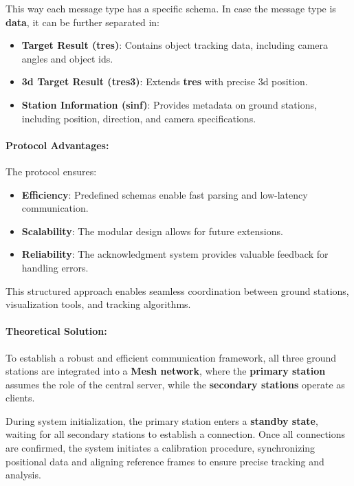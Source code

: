 This way each message type has a specific schema. In case the message type is \textbf{data}, it can be further separated in:

\begin{itemize}
	\item \textbf{Target Result (tres)}: Contains object tracking data, including camera angles and object \acrshort{id}s.
	\item \textbf{\acrshort{3d} Target Result (tres3)}: Extends \textbf{tres} with precise \acrshort{3d} position.
	\item \textbf{Station Information (sinf)}: Provides metadata on ground stations, including position, direction, and camera specifications.
\end{itemize}

\paragraph{Protocol Advantages:}

The protocol ensures:
\begin{itemize}
	\item \textbf{Efficiency}: Predefined schemas enable fast parsing and low-latency communication.
	\item \textbf{Scalability}: The modular design allows for future extensions.
	\item \textbf{Reliability}: The acknowledgment system provides valuable feedback for handling errors.
\end{itemize}

This structured approach enables seamless coordination between ground stations, visualization tools, and tracking algorithms.

\paragraph{Theoretical Solution:}  
To establish a robust and efficient communication framework, all three ground stations are integrated into a \textbf{Mesh network}, where the \textbf{primary station} assumes the role of the central server, while the \textbf{secondary stations} operate as clients.

During system initialization, the primary station enters a \textbf{standby state}, waiting for all secondary stations to establish a connection. Once all connections are confirmed, the system initiates a calibration procedure, synchronizing positional data and aligning reference frames to ensure precise tracking and analysis.  

